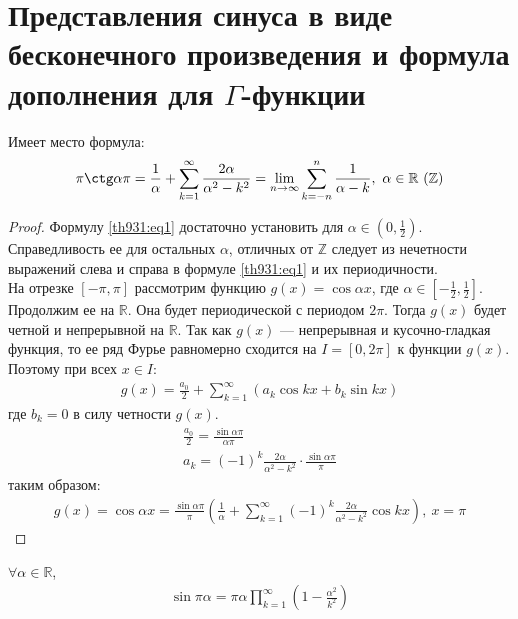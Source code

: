 \section{Представления синуса в виде бесконечного произведения и формула
дополнения для $\Gamma$-функции}
\begin{theorem}
  Имеет место формула:
  \begin{gather}
    \pi \ctg \alpha \pi = \frac{1}{\alpha} + \sum\limits_{k = 1}^{\infty}
    \frac{2\alpha}{\alpha^2 - k^2} = \lim\limits_{n \to \infty} \sum\limits_{k
    = -n}^{n} \frac{1}{\alpha - k}, \ \alpha \in \mathbb{R} \ (\mathbb{Z})
    \label{th931:eq1}
  \end{gather}
\end{theorem}
\begin{proof}
  Формулу \eqref{th931:eq1} достаточно установить для $\alpha \in (0,
  \frac{1}{2})$. Справедливость ее для остальных $\alpha$, отличных от
  $\mathbb{Z}$ следует из нечетности выражений слева и справа в формуле
  \eqref{th931:eq1} и их периодичности. \\ На отрезке $[-\pi, \pi]$ рассмотрим
  функцию $g(x) = \cos \alpha x$, где $\alpha \in [-\frac{1}{2}, \frac{1}{2}]$.
  Продолжим ее на $\mathbb{R}$. Она будет периодической с периодом $2\pi$.
  Тогда $g(x)$ будет четной и непрерывной на $\mathbb{R}$. Так как $g(x)$ ---
  непрерывная и кусочно-гладкая функция, то ее ряд Фурье равномерно сходится на
  $I = [0, 2\pi]$ к функции $g(x)$. Поэтому при всех $x \in I$:
  \begin{gather*}
    g(x) = \frac{a_0}{2} + \sum\limits_{k = 1}^{\infty} (a_k \cos kx + b_k
    \sin kx)
  \end{gather*}
  где $b_k = 0$ в силу четности $g(x)$.
  \begin{gather*}
    \frac{a_0}{2} = \frac{\sin \alpha \pi}{\alpha \pi} \\
    a_k = (-1)^k \frac{2\alpha}{\alpha^2 - k^2} \cdot \frac{\sin \alpha
    \pi}{\pi}
  \end{gather*}
  таким образом:
  \begin{gather*}
    g(x) = \cos \alpha x = \frac{\sin \alpha \pi}{\pi} \left(\frac{1}{\alpha} +
    \sum\limits_{k = 1}^{\infty} (-1)^k \frac{2\alpha}{\alpha^2 - k^2} \cos kx
    \right), \ x = \pi
  \end{gather*}
\end{proof}

\begin{theorem}[Эйлера]
  $\forall \alpha \in \mathbb{R}$,
  \begin{gather}
    \sin \pi \alpha = \pi \alpha \prod\limits_{k = 1}^\infty \left(1 -
    \frac{\alpha^2}{k^2}\right)
    \label{th932:eq1}
  \end{gather}
\end{theorem}

